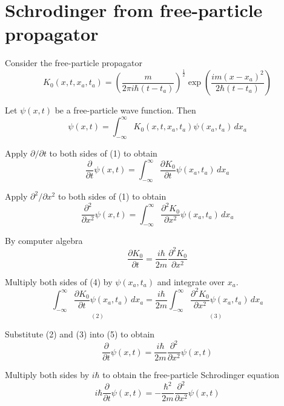 

\section*{Schrodinger from free-particle propagator}

Consider the free-particle propagator
\begin{equation*}
K_0(x,t,x_a,t_a)=\left(\frac{m}{2\pi i\hbar(t-t_a)}\right)^\frac{1}{2}
\exp\left(\frac{im(x-x_a)^2}{2\hbar(t-t_a)}\right)
\end{equation*}

Let $\psi(x,t)$ be a free-particle wave function.
Then
\begin{equation*}
\psi(x,t)=\int_{-\infty}^\infty K_0(x,t,x_a,t_a)\psi(x_a,t_a)\,dx_a
\tag{1}
\end{equation*}

Apply $\partial/\partial t$ to both sides of (1) to obtain
\begin{equation*}
\frac{\partial}{\partial t}\psi(x,t)
=\int_{-\infty}^\infty\frac{\partial K_0}{\partial t}
\psi(x_a,t_a)\,dx_a
\tag{2}
\end{equation*}

Apply $\partial^2/\partial x^2$ to both sides of (1) to obtain
\begin{equation*}
\frac{\partial^2}{\partial x^2}\psi(x,t)
=\int_{-\infty}^\infty\frac{\partial^2 K_0}{\partial x^2}
\psi(x_a,t_a)\,dx_a
\tag{3}
\end{equation*}

By computer algebra
\begin{equation*}
\frac{\partial K_0}{\partial t}
=\frac{i\hbar}{2m}\frac{\partial^2K_0}{\partial x^2}
\tag{4}
\end{equation*}

Multiply both sides of (4) by $\psi(x_a,t_a)$ and integrate over $x_a$.
\begin{equation*}
\underset{(2)}{\int_{-\infty}^\infty\frac{\partial K_0}{\partial t}\psi(x_a,t_a)\,dx_a}
=\frac{i\hbar}{2m}\underset{(3)}
{\int_{-\infty}^\infty\frac{\partial^2K_0}{\partial x^2}
\psi(x_a,t_a)\,dx_a}
\tag{5}
\end{equation*}

Substitute (2) and (3) into (5) to obtain
\begin{equation*}
\frac{\partial}{\partial t}\psi(x,t)
=\frac{i\hbar}{2m}\frac{\partial^2}{\partial x^2}\psi(x,t)
\end{equation*}

Multiply both sides by $i\hbar$ to obtain the free-particle Schrodinger equation
\begin{equation*}
i\hbar\frac{\partial}{\partial t}\psi(x,t)
=-\frac{\hbar^2}{2m}\frac{\partial^2}{\partial x^2}\psi(x,t)
\end{equation*}



